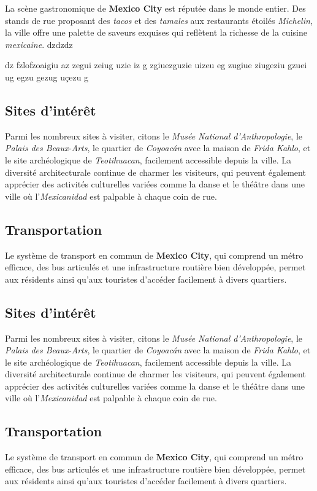 \documentclass[12pt, a4paper]{article}
\begin{document}
La scène gastronomique de \textbf{Mexico City} est réputée dans le monde entier. Des stands de rue proposant des \textit{tacos} et des \textit{tamales} aux restaurants étoilés \textit{Michelin}, la ville offre une palette de saveurs exquises qui reflètent la richesse de la cuisine \textit{mexicaine}.
dzdzdz

dz
fzlofzoaigiu 
az
zegui zeiug uzie iz
g
zgiuezguzie uizeu
 eg
zugiue ziugeziu gzuei 
ug 
 egzu gezug uçezu
g
\subsection*{\textbf{Sites d'intérêt}}

Parmi les nombreux sites à visiter, citons le \textit{Musée National d'Anthropologie}, le \textit{Palais des Beaux-Arts}, le quartier de \textit{Coyoacán} avec la maison de \textit{Frida Kahlo}, et le site archéologique de \textit{Teotihuacan}, facilement accessible depuis la ville.
La diversité architecturale continue de charmer les visiteurs, qui peuvent également apprécier des activités culturelles variées comme la danse et le théâtre dans une ville où l'\textit{Mexicanidad} est palpable à chaque coin de rue. \subsection*{\textbf{Transportation}} Le système de transport en commun de \textbf{Mexico City}, qui comprend un métro efficace, des bus articulés et une infrastructure routière bien développée, permet aux résidents ainsi qu'aux touristes d'accéder facilement à divers quartiers.

\subsection*{\textbf{Sites d'intérêt}}

Parmi les nombreux sites à visiter, citons le \textit{Musée National d'Anthropologie}, le \textit{Palais des Beaux-Arts}, le quartier de \textit{Coyoacán} avec la maison de \textit{Frida Kahlo}, et le site archéologique de \textit{Teotihuacan}, facilement accessible depuis la ville.
La diversité architecturale continue de charmer les visiteurs, qui peuvent également apprécier des activités culturelles variées comme la danse et le théâtre dans une ville où l'\textit{Mexicanidad} est palpable à chaque coin de rue. \subsection*{\textbf{Transportation}} Le système de transport en commun de \textbf{Mexico City}, qui comprend un métro efficace, des bus articulés et une infrastructure routière bien développée, permet aux résidents ainsi qu'aux touristes d'accéder facilement à divers quartiers.
\end{document}
